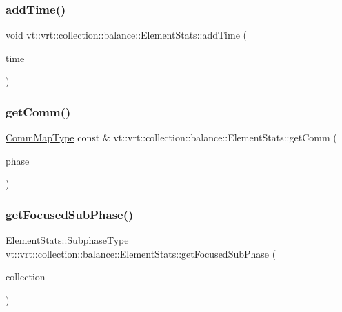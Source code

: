 \subsubsection{\texorpdfstring{add\+Time()}{addTime()}}
{\footnotesize\ttfamily void vt\+::vrt\+::collection\+::balance\+::\+Element\+Stats\+::add\+Time (\begin{DoxyParamCaption}\item[{\hyperlink{namespacevt_a876a9d0cd5a952859c72de8a46881442}{Time\+Type} const \&}]{time }\end{DoxyParamCaption})}

\mbox{\label{structvt_1_1vrt_1_1collection_1_1balance_1_1_element_stats_a917ec0f6f274acc254c24c01fa66afa6}} 
\subsubsection{\texorpdfstring{get\+Comm()}{getComm()}}
{\footnotesize\ttfamily \hyperlink{namespacevt_1_1vrt_1_1collection_1_1balance_aa50d4cbbfa3c643e7303fc6e08f411fb}{Comm\+Map\+Type} const  \& vt\+::vrt\+::collection\+::balance\+::\+Element\+Stats\+::get\+Comm (\begin{DoxyParamCaption}\item[{\hyperlink{structvt_1_1vrt_1_1collection_1_1balance_1_1_element_stats_a6edee983bb2ae96a341763520af33c66}{Phase\+Type} const \&}]{phase }\end{DoxyParamCaption})}

\mbox{\label{structvt_1_1vrt_1_1collection_1_1balance_1_1_element_stats_a15c03cb8f5873d0c8fea615767254856}} 
\subsubsection{\texorpdfstring{get\+Focused\+Sub\+Phase()}{getFocusedSubPhase()}}
{\footnotesize\ttfamily \hyperlink{structvt_1_1vrt_1_1collection_1_1balance_1_1_element_stats_af9ec1f2527b6569a003579f7950db71e}{Element\+Stats\+::\+Subphase\+Type} vt\+::vrt\+::collection\+::balance\+::\+Element\+Stats\+::get\+Focused\+Sub\+Phase (\begin{DoxyParamCaption}\item[{\hyperlink{namespacevt_a1b417dd5d684f045bb58a0ede70045ac}{Virtual\+Proxy\+Type}}]{collection }\end{DoxyParamCaption})\hspace{0.3cm}{\ttfamily [static]}}

